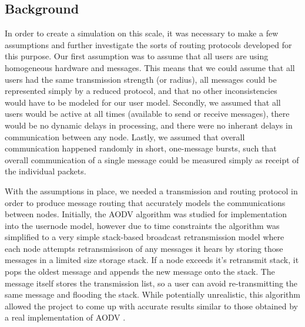 \subsection{Background}
In order to create a simulation on this scale, it was necessary to make a few assumptions
and further investigate the sorts of routing protocols developed for this purpose.
Our first assumption was to assume that all users are using homogeneous hardware and messages.
This means that we could assume that all users had the same transmission strength (or radius),
all messages could be represented simply by a reduced protocol, and that no other inconsistencies
would have to be modeled for our user model.
Secondly, we assumed that all users would be active at all times (available to send or receive
messages), there would be no dynamic delays in processing, and there were no inherant delays in
communication between any node.
Lastly, we assumed that overall communication happened randomly in short, one-message bursts,
such that overall communication of a single message could be measured simply as receipt of the
individual packets.

With the assumptions in place, we needed a transmission and routing protocol in order to produce
message routing that accurately models the communications between nodes.
Initially, the AODV algorithm \cite{perkins99,roter00} was studied for implementation into the
usernode model, however due to time constraints the algorithm was simplified to a very simple
stack-based broadcast retransmission model where each node attempts retransmissison of any
messages it hears by storing those messages in a limited size storage stack.
If a node exceeds it's retransmit stack, it pops the oldest message and appends the new message 
onto the stack.
The message itself stores the transmission list, so a user can avoid re-transmitting the same
message and flooding the stack.
While potentially unrealistic, this algorithm allowed the project to come up with accurate
results similar to those obtained by a real implementation of AODV \cite{morshed08}.
